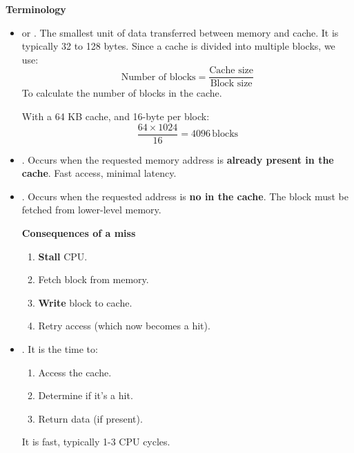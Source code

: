 \highspace
\begin{flushleft}
    \textcolor{Green3}{ \textbf{Terminology}}
\end{flushleft}
\begin{itemize}
    \item {} or . The smallest unit of data transferred between memory and cache. It is typically 32 to 128 bytes. Since a cache is divided into multiple blocks, we use:
    \begin{equation}
        \text{Number of blocks} = \dfrac{\text{Cache size}}{\text{Block size}}
    \end{equation}
    To calculate the number of blocks in the cache.

    \begin{examplebox}
        With a 64 KB cache, and 16-byte per block:
        \begin{equation*}
            \dfrac{64 \times 1024}{16} = 4096 \,\text{blocks}
        \end{equation*}
    \end{examplebox}


    \item[\textcolor{Green3}{\faIcon{check}}] . Occurs when the requested memory address is \textbf{already present in the cache}. Fast access, minimal latency.
    

    \item[\textcolor{Red2}{\faIcon{times}}] . Occurs when the requested address is \textbf{no in the cache}. The block must be fetched from lower-level memory.

    \textcolor{Red2}{ \textbf{Consequences of a miss}}
    \begin{enumerate}
        \item \textbf{Stall} CPU.
        \item Fetch block from memory.
        \item \textbf{Write} block to cache.
        \item Retry access (which now becomes a hit).
    \end{enumerate}


    \newpage


    \item {}. It is the time to:
    \begin{enumerate}
        \item Access the cache.
        \item Determine if it's a hit.
        \item Return data (if present).
    \end{enumerate}
    It is fast, typically 1-3 CPU cycles.



\end{itemize}
